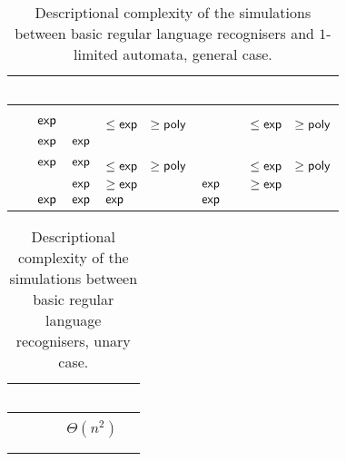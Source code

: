 \begin{table}
	\centering
	\renewcommand{\hstdef}{.55}
	\begin{tabular}{|l|l|l|p{3.1em}|l|l|p{3.1em}|}
		\hline
		~     & \ODFA              & \ONFA   & \TDFA                                            & \TNFA   & \OLA   & \ODLA                                            \\ \hline
		\ODFA & \cY                & \Ctriv  & \Ctriv                                           & \Ctriv  & \Ctriv & \Ctriv                                           \\ \hline
		\ONFA & $\mathsf{exp}$            & \cY     & \cR $\le\Cexp\hst$ $\ge\Cpoly$                   & \Ctriv  & \Ctriv & \cB $\le\Cexp\hst$ $\ge\Cpoly$                   \\ \hline
		\TDFA & $\mathsf{exp}$            & $\mathsf{exp}$ & \cY                                              & \Ctriv  & \Ctriv & \Ctriv                                           \\ \hline
		\TNFA & $\mathsf{exp}$            & $\mathsf{exp}$ & \cR $\le\Cexp\hst$ $\ge\Cpoly$                   & \cY     & \Ctriv & \cB $\le\Cexp\hst$ $\ge\Cpoly$                   \\ \hline
		\OLA  & \rbt[.2]{$\Cdexp$} & $\mathsf{exp}$ & \cG \rbt[.2]{$\le\Cdexp\hst[.1]$} $\ge\Cexp\hst$ & $\mathsf{exp}$ & \cY    & \cG \rbt[.2]{$\le\Cdexp\hst[.1]$} $\ge\Cexp\hst$ \\ \hline
		\ODLA & $\mathsf{exp}$            & $\mathsf{exp}$ & $\mathsf{exp}$                                          & $\mathsf{exp}$ & \Ctriv & \cY                                              \\ \hline
	\end{tabular}
	\caption{Descriptional complexity of the simulations between basic regular language recognisers and $1$-limited automata, general case.}
\end{table}

\begin{table}
	\centering
	\renewcommand{\arraystretch}{1.2}
	\begin{tabular}{|l|l|l|p{4.3em}|l|}
		\hline
		~     & \ODFA           & \ONFA           & \TDFA                                            & \TNFA  \\ \hline
		\ODFA & \cY             & \Ctriv          & \Ctriv                                           & \Ctriv \\ \hline
		\ONFA & \rbt{$\CsubEq$} & \cY             & \cR $\Theta(n^2)$                                & \Ctriv \\ \hline
		\TDFA & \rbt{$\CsubEq$} & \rbt{$\CsubEq$} & \cY                                              & \Ctriv \\ \hline
		\TNFA & \rbt{$\CsubEq$} & \rbt{$\CsubEq$} & \cR \rbt[.4]{$\le\Csubln$} \rbt[.3]{$\ge\Cpoly$} & \cY    \\ \hline
	\end{tabular}
	\caption{Descriptional complexity of the simulations between basic regular language recognisers, unary case.}
\end{table}

